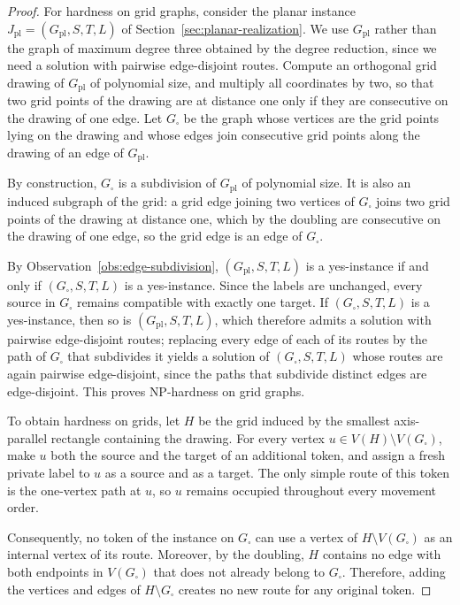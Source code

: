 \documentclass[a4paper,USenglish,thm-restate]{lipics-v2021}
\theoremstyle{problemstyle}
\begin{document}
\begin{proof}
For hardness on grid graphs, consider the planar instance
$J_{\mathrm{pl}}=(G_{\mathrm{pl}},S,T,L)$ of
Section~\ref{sec:planar-realization}. We use $G_{\mathrm{pl}}$ rather than
the graph of maximum degree three obtained by the degree reduction, since
we need a solution with pairwise edge-disjoint routes. Compute an
orthogonal grid drawing of $G_{\mathrm{pl}}$ of polynomial size, and
multiply all coordinates by two, so that two grid points of the drawing
are at distance one only if they are consecutive on the drawing of one
edge. Let $G_\square$ be the graph whose vertices are the grid points
lying on the drawing and whose edges join consecutive grid points along
the drawing of an edge of $G_{\mathrm{pl}}$.

By construction, $G_\square$ is a subdivision of $G_{\mathrm{pl}}$ of
polynomial size. It is also an induced subgraph of the grid: a grid edge
joining two vertices of $G_\square$ joins two grid points of the drawing
at distance one, which by the doubling are consecutive on the drawing of
one edge, so the grid edge is an edge of $G_\square$.

By Observation~\ref{obs:edge-subdivision}, $(G_{\mathrm{pl}},S,T,L)$ is a
yes-instance if and only if $(G_\square,S,T,L)$ is a yes-instance. Since
the labels are unchanged, every source in $G_\square$ remains compatible
with exactly one target. If $(G_\square,S,T,L)$ is a yes-instance, then so
is $(G_{\mathrm{pl}},S,T,L)$, which therefore admits a solution with
pairwise edge-disjoint routes; replacing every edge of each of its routes
by the path of $G_\square$ that subdivides it yields a solution of
$(G_\square,S,T,L)$ whose routes are again pairwise edge-disjoint, since
the paths that subdivide distinct edges are edge-disjoint. This proves
\textsf{NP}-hardness on grid graphs.

To obtain hardness on grids, let $H$ be the grid induced by the smallest axis-parallel rectangle containing the drawing. For every vertex $u\in V(H)\setminus V(G_\square)$, make $u$ both the source and the target of an additional token, and assign a fresh private label to $u$ as a source and as a target. The only simple route of this token is the one-vertex path at $u$, so $u$ remains occupied throughout every movement order.

Consequently, no token of the instance on $G_\square$ can use a vertex of $H\setminus V(G_\square)$ as an internal vertex of its route. Moreover, by the doubling, $H$ contains no edge with both endpoints in $V(G_\square)$ that does not already belong to $G_\square$. Therefore, adding the vertices and edges of $H\setminus G_\square$ creates no new route for any original token.


\end{proof}
\end{document}
